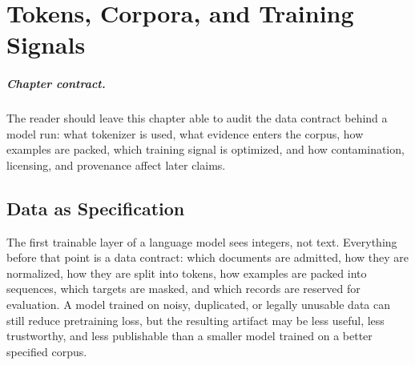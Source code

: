 \chapter{Tokens, Corpora, and Training Signals}
\label{ch:tokens-corpora-training-signals}


\paragraph{Chapter contract.} The reader should leave this chapter able to audit the data contract behind a model run: what tokenizer is used, what evidence enters the corpus, how examples are packed, which training signal is optimized, and how contamination, licensing, and provenance affect later claims.

\section{Data as Specification}
\label{sec:data-as-specification}

The first trainable layer of a language model sees integers, not text. Everything before that point is a data contract: which documents are admitted, how they are normalized, how they are split into tokens, how examples are packed into sequences, which targets are masked, and which records are reserved for evaluation. A model trained on noisy, duplicated, or legally unusable data can still reduce pretraining loss, but the resulting artifact may be less useful, less trustworthy, and less publishable than a smaller model trained on a better specified corpus.


